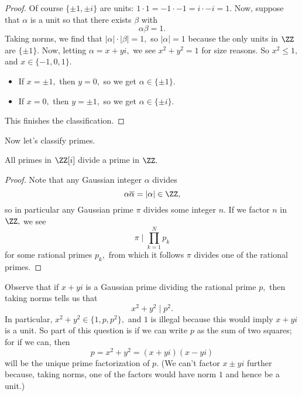 \begin{proof}
    Of course $\{\pm1,\pm i\}$ are units: $1\cdot1=-1\cdot-1=i\cdot-i=1.$ Now, suppose that $\alpha$ is a unit so that there exists $\beta$ with
    \[\alpha\beta=1.\]
    Taking norms, we find that $|\alpha|\cdot|\beta|=1,$ so $|\alpha|=1$ because the only units in $\ZZ$ are $\{\pm1\}.$ Now, letting $\alpha=x+yi,$ we see $x^2+y^2=1$ for size reasons. So $x^2\le1,$ and $x\in\{-1,0,1\}.$
    \begin{itemize}
        \item If $x=\pm1,$ then $y=0,$ so we get $\alpha\in\{\pm1\}.$
        \item If $x=0,$ then $y=\pm1,$ so we get $\alpha\in\{\pm i\}.$
    \end{itemize}
    This finishes the classification.
\end{proof}
Now let's classify primes.
\begin{lemma} \label{lem:pliesoverp}
    All primes in $\ZZ[i]$ divide a prime in $\ZZ.$
\end{lemma}
\begin{proof}
    Note that any Gaussian integer $\alpha$ divides 
    \[\alpha\overline\alpha=|\alpha|\in\ZZ,\]
    so in particular any Gaussian prime $\pi$ divides some integer $n.$ If we factor $n$ in $\ZZ,$ we see
    \[\pi\mid\prod_{k=1}^Np_k\]
    for some rational primes $p_k,$ from which it follows $\pi$ divides one of the rational primes.
\end{proof}
Observe that if $x+yi$ is a Gaussian prime dividing the rational prime $p,$ then taking norms tells us that
\[x^2+y^2\mid p^2.\]
In particular, $x^2+y^2\in\{1,p,p^2\},$ and $1$ is illegal because this would imply $x+yi$ is a unit. So part of this question is if we can write $p$ as the sum of two squares; for if we can, then
\[p=x^2+y^2=(x+yi)(x-yi)\]
will be the unique prime factorization of $p.$ (We can't factor $x\pm yi$ further because, taking norms, one of the factors would have norm $1$ and hence be a unit.)

